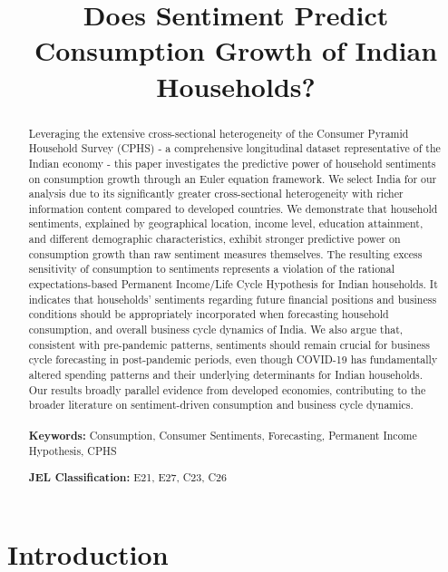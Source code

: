 \documentclass[
  abstract]{scrartcl}
\title{Does Sentiment Predict Consumption Growth of Indian Households?}
\author{}
\date{}  %
\begin{document}
\maketitle

\begin{abstract}
Leveraging the extensive cross-sectional heterogeneity of the Consumer
Pyramid Household Survey (CPHS) - a comprehensive longitudinal dataset
representative of the Indian economy - this paper investigates the
predictive power of household sentiments on consumption growth through
an Euler equation framework. We select India for our analysis due to its
significantly greater cross-sectional heterogeneity with richer
information content compared to developed countries. We demonstrate that
household sentiments, explained by geographical location, income level,
education attainment, and different demographic characteristics, exhibit
stronger predictive power on consumption growth than raw sentiment
measures themselves. The resulting excess sensitivity of consumption to
sentiments represents a violation of the rational expectations-based
Permanent Income/Life Cycle Hypothesis for Indian households. It
indicates that households' sentiments regarding future financial
positions and business conditions should be appropriately incorporated
when forecasting household consumption, and overall business cycle
dynamics of India. We also argue that, consistent with pre-pandemic
patterns, sentiments should remain crucial for business cycle
forecasting in post-pandemic periods, even though COVID-19 has
fundamentally altered spending patterns and their underlying
determinants for Indian households. Our results broadly parallel
evidence from developed economies, contributing to the broader
literature on sentiment-driven consumption and business cycle
dynamics. %
\\
\\
\noindent%
\textbf{Keywords:} Consumption, Consumer
Sentiments, Forecasting, Permanent Income Hypothesis, CPHS %
 
\vspace{0.5cm}
\noindent%
\textbf{JEL Classification:} E21, E27, C23, C26
\end{abstract}

\newpage
{}  
\setcounter{page}{1} 

\section{Introduction}\label{sec-1}
\end{document}
